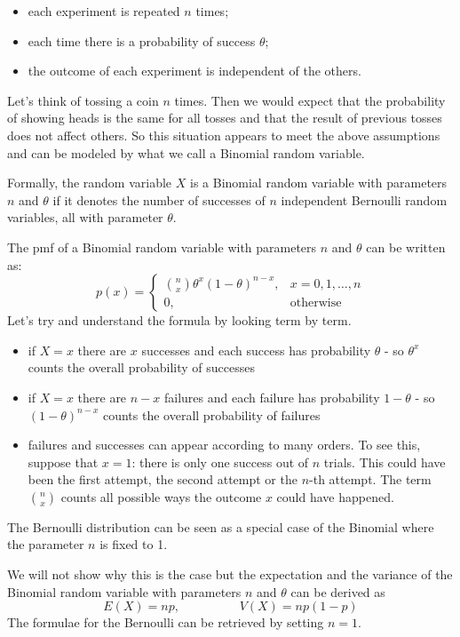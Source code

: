 \documentclass[
]{book}
\begin{document}
\begin{itemize}
\item
  each experiment is repeated \(n\) times;
\item
  each time there is a probability of success \(\theta\);
\item
  the outcome of each experiment is independent of the others.
\end{itemize}

Let's think of tossing a coin \(n\) times. Then we would expect that the probability of showing heads is the same for all tosses and that the result of previous tosses does not affect others. So this situation appears to meet the above assumptions and can be modeled by what we call a Binomial random variable.

Formally, the random variable \(X\) is a Binomial random variable with parameters \(n\) and \(\theta\) if it denotes the number of successes of \(n\) independent Bernoulli random variables, all with parameter \(\theta\).

The pmf of a Binomial random variable with parameters \(n\) and \(\theta\) can be written as:
\[
p(x)=\left\{
\begin{array}{ll}
\binom{n}{x}\theta^{x}(1-\theta)^{n-x}, & x = 0,1,\dots,n\\
0, & \mbox{otherwise}
\end{array}
\right.
\]
Let's try and understand the formula by looking term by term.

\begin{itemize}
\item
  if \(X=x\) there are \(x\) successes and each success has probability \(\theta\) - so \(\theta^x\) counts the overall probability of successes
\item
  if \(X=x\) there are \(n-x\) failures and each failure has probability \(1-\theta\) - so \((1-\theta)^{n-x}\) counts the overall probability of failures
\item
  failures and successes can appear according to many orders. To see this, suppose that \(x=1\): there is only one success out of \(n\) trials. This could have been the first attempt, the second attempt or the \(n\)-th attempt. The term \(\binom{n}{x}\) counts all possible ways the outcome \(x\) could have happened.
\end{itemize}

The Bernoulli distribution can be seen as a special case of the Binomial where the parameter \(n\) is fixed to 1.

We will not show why this is the case but the expectation and the variance of the Binomial random variable with parameters \(n\) and \(\theta\) can be derived as
\[
E(X)=np, \hspace{2cm} V(X)=np(1-p)
\]
The formulae for the Bernoulli can be retrieved by setting \(n=1\).
\end{document}
